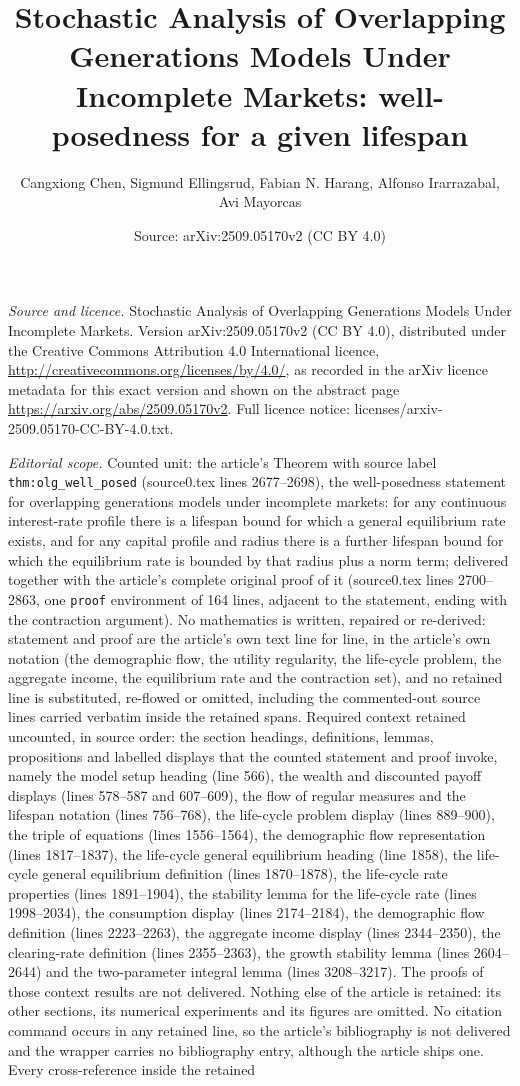 \documentclass[10pt,a4paper]{amsart}
\title[Overlapping generations under incomplete markets]{Stochastic Analysis of Overlapping Generations Models Under Incomplete Markets: well-posedness for a given lifespan}
\author{Cangxiong Chen, Sigmund Ellingsrud, Fabian N. Harang, Alfonso Irarrazabal, Avi Mayorcas}
\date{Source: arXiv:2509.05170v2 (CC BY 4.0)}
\theoremstyle{plain}
\theoremstyle{plain}
\theoremstyle{definition}
\theoremstyle{remark}
\begin{document}
\maketitle
\noindent\emph{Source and licence.} Stochastic Analysis of Overlapping Generations Models Under Incomplete Markets. Version arXiv:2509.05170v2 (CC BY 4.0), distributed under the Creative Commons Attribution 4.0 International licence, \url{http://creativecommons.org/licenses/by/4.0/}, as recorded in the arXiv licence metadata for this exact version and shown on the abstract page \url{https://arxiv.org/abs/2509.05170v2}. Full licence notice: licenses/arxiv-2509.05170-CC-BY-4.0.txt.\par\smallskip

\noindent\textit{Editorial scope.} Counted unit: the article's Theorem with source label \texttt{thm:olg\_well\_posed} (source0.tex lines 2677--2698), the well-posedness statement for overlapping generations models under incomplete markets: for any continuous interest-rate profile there is a lifespan bound for which a general equilibrium rate exists, and for any capital profile and radius there is a further lifespan bound for which the equilibrium rate is bounded by that radius plus a norm term; delivered together with the article's complete original proof of it (source0.tex lines 2700--2863, one \texttt{proof} environment of 164 lines, adjacent to the statement, ending with the contraction argument). No mathematics is written, repaired or re-derived: statement and proof are the article's own text line for line, in the article's own notation (the demographic flow, the utility regularity, the life-cycle problem, the aggregate income, the equilibrium rate and the contraction set), and no retained line is substituted, re-flowed or omitted, including the commented-out source lines carried verbatim inside the retained spans. Required context retained uncounted, in source order: the section headings, definitions, lemmas, propositions and labelled displays that the counted statement and proof invoke, namely the model setup heading (line 566), the wealth and discounted payoff displays (lines 578--587 and 607--609), the flow of regular measures and the lifespan notation (lines 756--768), the life-cycle problem display (lines 889--900), the triple of equations (lines 1556--1564), the demographic flow representation (lines 1817--1837), the life-cycle general equilibrium heading (line 1858), the life-cycle general equilibrium definition (lines 1870--1878), the life-cycle rate properties (lines 1891--1904), the stability lemma for the life-cycle rate (lines 1998--2034), the consumption display (lines 2174--2184), the demographic flow definition (lines 2223--2263), the aggregate income display (lines 2344--2350), the clearing-rate definition (lines 2355--2363), the growth stability lemma (lines 2604--2644) and the two-parameter integral lemma (lines 3208--3217). The proofs of those context results are not delivered. Nothing else of the article is retained: its other sections, its numerical experiments and its figures are omitted. No citation command occurs in any retained line, so the article's bibliography is not delivered and the wrapper carries no bibliography entry, although the article ships one. Every cross-reference inside the retained 
\end{document}
